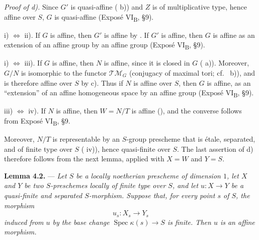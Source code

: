 \medskip
\noindent\textit{Proof of d).}
Since \(G'\) is quasi-affine ( b)) and \(Z\) is of
multiplicative type, hence affine over \(S\), \(G\) is quasi-affine
(Exposé VI\textsubscript{B}, \S9).

\medskip
\noindent i) \(\Longleftrightarrow\) ii).
If \(G\) is affine, then \(G'\) is affine by . If
\(G'\) is affine, then \(G\) is affine as an extension of an affine
group by an affine group (Exposé VI\textsubscript{B}, \S9).

\medskip
\noindent i) \(\Longleftrightarrow\) iii).
If \(G\) is affine, then \(N\) is affine, since it is closed in
\(G\) ( a)). Moreover, \(G/N\) is isomorphic to the
functor \(\mathscr{TM}_G\) (conjugacy of maximal tori; cf.\
 b)), and is therefore affine over \(S\) by c).
Thus if \(N\) is affine over \(S\), then \(G\) is affine, as an
``extension'' of an affine homogeneous space by an affine group
(Exposé VI\textsubscript{B}, \S9).

\medskip
\noindent iii) \(\Longleftrightarrow\) iv).
If \(N\) is affine, then \(W=N/T\) is affine (), and
the converse follows from Exposé VI\textsubscript{B}, \S9.

Moreover, \(N/T\) is representable by an \(S\)-group prescheme
that is étale, separated, and of finite type over \(S\) (\SGARefLink{sga3:xv:proposition:7-1}{Exposé XV,
7.1} iv)), hence quasi-finite over \(S\). The last assertion of d)
therefore follows from the next lemma, applied with \(X=W\) and
\(Y=S\).

\medskip
\noindent{}%
\textbf{Lemma 4.2.} --- \textit{Let \(S\) be a locally noetherian
prescheme of dimension \(1\), let \(X\) and \(Y\) be two
\(S\)-preschemes locally of finite type over \(S\), and let
\(u:X\to Y\) be a quasi-finite and separated \(S\)-morphism.
Suppose that, for every point \(s\) of \(S\), the morphism}
\[
  u_s:X_s\longrightarrow Y_s
\]
\textit{induced from \(u\) by the base change
\(\operatorname{Spec}\kappa(s)\to S\) is finite. Then \(u\) is an
affine morphism.}

